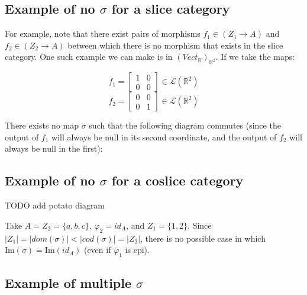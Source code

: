 \documentclass[12pt, letterpaper, twoside]{report}
\begin{document}
\subsection*{Example of no $\sigma$ for a slice category}

For example, note that there exist pairs of morphisms $f_1 \in (Z_1 \to A)$ and $f_2 \in (Z_2 \to A)$ between which there is no morphism that exists in the slice category. One such example we can make is in $(Vect_\mathbb{R})_{\mathbb{R}^2}$. If we take the maps:

$$f_1 = \begin{bmatrix} 1 & 0 \\ 0 & 0 \end{bmatrix} \in \mathcal{L}(\mathbb{R}^2)$$
$$f_2 = \begin{bmatrix} 0 & 0 \\ 0 & 1 \end{bmatrix} \in \mathcal{L}(\mathbb{R}^2)$$

There exists no map $\sigma$ such that the following diagram commutes (since the output of $f_1$ will always be null in its second coordinate, and the output of $f_2$ will always be null in the first):



\subsection*{Example of no $\sigma$ for a coslice category}

TODO add potato diagram

Take $A = Z_2 = \{ a, b, c \}$, $\varphi_2 = id_A$, and $Z_1 = \{ 1, 2 \}$. Since $|Z_1| = |dom(\sigma)| < |cod(\sigma)| = |Z_2|$, there is no possible case in which $\text{Im} (\sigma) = \text{Im} (id_A)$ (even if $\varphi_1$ is epi).


\subsection*{Example of multiple $\sigma$}
\end{document}
